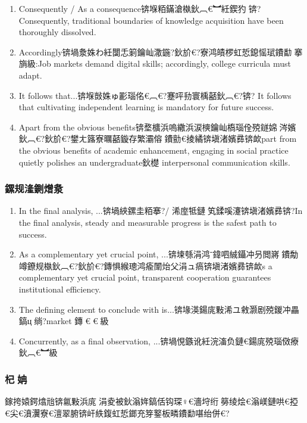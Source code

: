 ﻿\documentclass[lang=cn,11pt]{elegantbook}
\begin{document}
\begin{enumerate}
\item Consequently / As a consequence锛堢粨鏋滄槸鈥︹€︼紝鍥犳锛?Consequently, traditional boundaries of knowledge acquisition have been thoroughly dissolved.
\item Accordingly锛堝洜姝わ紝闅忎箣鑰屾潵鍦?鈥斺€?寮鸿皟椤虹悊鎴愮珷鐨勫搴旓級:Job markets demand digital skills; accordingly, college curricula must adapt.
\item It follows that...锛堢敱姝ゅ彲瑙佲€︹€?蹇呯劧寰楀嚭鈥︹€?锛? It follows that cultivating independent learning is mandatory for future success.
\item Apart from the obvious benefits锛堥櫎浜嗚繖浜涙樉鑰屾槗瑙佺殑鐩婂涔嬪鈥︹€?鈥斺€?鐢ㄤ簬寮曞嚭鏇存繁灞傛鐨勯€掕繘锛塡渚嬪彞锛欰part from the obvious benefits of academic enhancement, engaging in social practice quietly polishes an undergraduate鈥檚 interpersonal communication skills.
\end{enumerate}

\subsubsection{鏍规湰鍘熷洜}

\begin{enumerate}
\item In the final analysis, ...锛堝綊鏍圭粨搴?/ 浠庢牴鏈笂鍒嗘瀽锛塡渚嬪彞锛?In the final analysis, steady and measurable progress is the safest path to success.
\item As a complementary yet crucial point, ...锛堜綔涓鸿ˉ鍏呬絾鑷冲叧閲嶈鐨勪竴鐐规槸鈥︹€?鈥斺€?鏄惧緱璁鸿瘉闈炲父涓ュ瘑锛塡渚嬪彞锛欰s a complementary yet crucial point, transparent cooperation guarantees institutional efficiency.
\item The defining element to conclude with is...锛堟渶鍚庣敤浠ユ敹灏剧殑鍐冲畾鎬ц绱?market 鏄€︹€︼級
\item Concurrently, as a final observation, ...锛堝悓鏃讹紝浣滀负鏈€鍚庣殑瑙傚療鈥︹€︼級 
\end{enumerate}

\subsubsection{杞姌}

鎵挎媴鍔熻兘锛氱敤浜庣涓夌被鈥滃姩鎬佸钩琛♀€濇垨绗簩绫烩€滃嵄鏈哄€掗€尖€濆瀷寮€澶翠腑锛屽紩鍑虹悊鎯充笌鐜板疄鐨勫啿绐併€?
\end{document}
